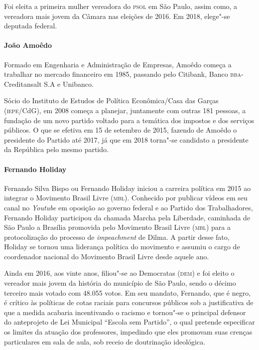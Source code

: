 Foi eleita a primeira mulher vereadora do \textsc{psol} em São Paulo, assim como,
a vereadora mais jovem da Câmara nas eleições de 2016. Em 2018, elege"-se
deputada federal.

\paragraph{João Amoêdo}

Formado em Engenharia e Administração de Empresas, Amoêdo começa a
trabalhar no mercado financeiro em 1985, passando pelo Citibank, Banco
\textsc{bba}-Creditansalt S.A e Unibanco.

Sócio do Instituto de Estudos de Política Econômica/Casa das Garças
(\textsc{iepe}/CdG), em 2008 começa a planejar, juntamente com outras 181
pessoas, a fundação de um novo partido voltado para a temática dos
impostos e dos serviços públicos. O que se efetiva em 15 de setembro de
2015, fazendo de Amoêdo o presidente do Partido até 2017, já que em 2018
torna"-se candidato a presidente da República pelo mesmo partido.

\paragraph{Fernando Holiday}

Fernando Silva Bispo ou Fernando Holiday iniciou a carreira política em
2015 ao integrar o Movimento Brasil Livre (\textsc{mbl}). Conhecido por publicar
vídeos em seu canal no \emph{Youtube} em oposição ao governo federal e
ao Partido dos Trabalhadores, Fernando Holiday participou da chamada
Marcha pela Liberdade, caminhada de São Paulo a Brasília promovida pelo
Movimento Brasil Livre (\textsc{mbl}) para a protocolização do processo de
\emph{impeachment} de Dilma. A partir desse fato, Holiday se tornou uma
liderança política do movimento e assumiu o cargo de coordenador
nacional do Movimento Brasil Livre desde aquele ano.

Ainda em 2016, aos vinte anos, filiou"-se ao Democratas (\textsc{dem}) e foi
eleito o vereador mais jovem da história do município de São Paulo,
sendo o décimo terceiro mais votado com 48.055 votos. Em seu mandato,
Fernando, que é negro, é crítico às políticas de cotas raciais para
concursos públicos sob a justificativa de que a medida acabaria
incentivando o racismo e tornou"-se o principal defensor do anteprojeto
de Lei Municipal ``Escola sem Partido'', o qual pretende especificar os
limites da atuação dos professores, impedindo que eles promovam suas
crenças particulares em sala de aula, sob receio de doutrinação
ideológica.

